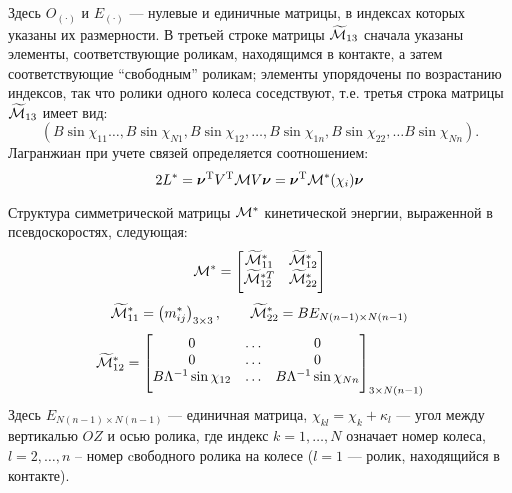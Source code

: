 Здесь $O_{(\boldsymbol{\cdot})}$ и $E_{(\boldsymbol{\cdot})}$ --- нулевые и единичные матрицы, в индексах которых указаны их размерности. В третьей строке матрицы $\widetilde{\mathcal{M}}_{13}$ сначала указаны элементы, соответствующие роликам, находящимся в контакте, а затем соответствующие ``свободным'' роликам; элементы упорядочены по возрастанию индексов, так что ролики одного колеса соседствуют, т.е. третья строка матрицы $\widetilde{\mathcal{M}}_{13}$ имеет вид:
$$
    \left( B\sin\chi_{11} \ldots, B\sin\chi_{N1}, B\sin\chi_{12}, \ldots, B\sin\chi_{1n}, B\sin\chi_{22}, \ldots B\sin\chi_{Nn} \right).
$$
Лагранжиан при учете связей определяется соотношением:
$$ 2L^{*}  = \boldsymbol{\mathbf{\nu}}^\mathrm{T} V^\mathrm{T}\mathcal{M} V\boldsymbol{\mathbf{\nu}} = \boldsymbol{\mathbf{\nu}}^\mathrm{T} \mathcal{M}^*(\chi_i)\boldsymbol{\mathbf{\nu}} $$

Структура симметрической матрицы $\mathcal{M}^*$ кинетической энергии, выраженной в псевдоскоростях, следующая:
$$
\M^* = 
    \begin{bmatrix}
        \widetilde{\M}^*_{11} & \widetilde{\M}^*_{12} \\
        \widetilde{\M}^{*T}_{12} & \widetilde{\M}^*_{22} \\[4pt]
    \end{bmatrix}
\vsp
$$
$$
\widetilde{\M}^*_{11} = 
    \left(
        m^*_{ij}
    \right)_{3\times3},
\qquad
\widetilde{\M}^*_{22} = 
    BE_{N(n-1) \times N(n-1)}
\vsp
$$
$$
\widetilde{\M}^*_{12} = 
    \begin{bmatrix}
        0&\ldots& 0 \\
        0&\ldots&0 \\
        B\Lambda^{-1}\sin\chi_{12}&\ldots& B\Lambda^{-1}\sin\chi_{Nn}\\[4pt]
    \end{bmatrix}_{3\times N(n-1)}
\vsp
$$
Здесь $E_{N(n-1) \times N(n-1)}$ --- единичная матрица, $\chi_{kl} = \chi_k+\kappa_l$ --- угол между вертикалью $OZ$ и осью ролика, где индекс $k = 1,\dots,N$ означает номер колеса, $l = 2,\ldots, n$ -- номер cвободного ролика на колесе ($l = 1$ --- ролик, находящийся в контакте).

